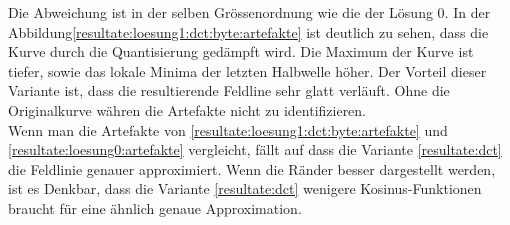 Die Abweichung ist in der selben Grössenordnung wie die der Lösung 0. In der Abbildung\ref{resultate:loesung1:dct:byte:artefakte} ist deutlich zu sehen, dass die Kurve durch die Quantisierung gedämpft wird. Die Maximum der Kurve ist tiefer, sowie das lokale Minima der letzten Halbwelle höher. Der Vorteil dieser Variante ist, dass die resultierende Feldline sehr glatt verläuft. Ohne die Originalkurve währen die Artefakte nicht zu identifizieren.\\
Wenn man die Artefakte von \ref{resultate:loesung1:dct:byte:artefakte} und \ref{resultate:loesung0:artefakte} vergleicht, fällt auf dass die Variante \ref{resultate:dct} die Feldlinie genauer approximiert. Wenn die Ränder besser dargestellt werden, ist es Denkbar, dass die Variante \ref{resultate:dct} wenigere Kosinus-Funktionen braucht für eine ähnlich genaue Approximation.


